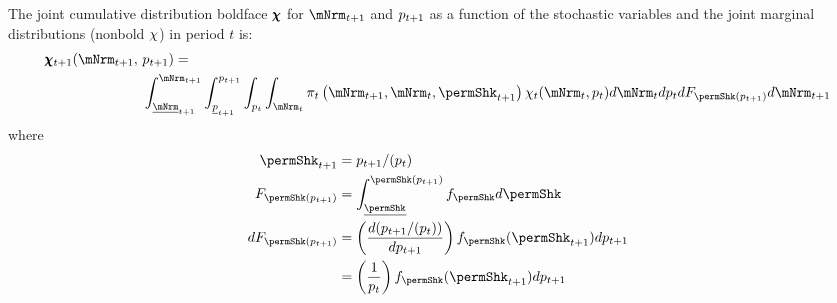 \documentclass[\econtexRoot/BufferStockTheory]{subfiles}
\begin{document}
The joint cumulative distribution boldface $\pmb{\chi}$ for $\mNrmNxt$ and $p_{t+1}$ as a function of the stochastic variables and the joint marginal distributions (nonbold $\chi$) in period $t$ is:
\begin{equation}
  \begin{aligned} \label{eq:MeasTrnstCDF}
  \pmb{\mpPrb}_{t+1}(\mNrmNxt,~& \permLvlPrbNxt) =  \\ &
                                          \int_{\mNrmNxtBot}^{\mNrmNxt}
                                          \int_{\permLvlPrbNxtBot}^{\permLvlPrbNxt}
                                          \int_{\permLvlPrbNow} 
                                          \int_{\mNrmNow} \lomdkPrb_{t}\left(\mNrmNxt,\mNrmNow,\permShkPrbNxt\right)\mpPrb_{t}(\mNrmNow,\permLvlPrbNow)  d \mNrmNow                                                                                     d \permLvlPrbNow
                                                d F_{\permShk(\permLvlPrbNxt)}
                                                d \mNrmNxt \notag
\end{aligned}\end{equation}
where 
\begin{align*}
  \permShkPrbNxt & = \permLvlPrbNxt/(\PermGroFac \permLvlPrbNow) 
\\    F_{\permShk(\permLvlPrbNxt)} & = \int_{\permShkPrbBot}^{\permShk(\permLvlPrbNxt)} f_{\permShk} d\permShk
    \\ dF_{\permShk(\permLvlPrbNxt)} & = \left(\frac{d (\permLvlPrbNxt/(\PermGroFac \permLvlPrbNow))}{d\permLvlPrbNxt}
                             \right)f_{\permShk}(\permShkPrbNxt) d \permLvlPrbNxt 
\\ & = \left(\frac{1}{\PermGroFac \permLvlPrbNow}                             \right)f_{\permShk}(\permShkPrbNxt) d \permLvlPrbNxt 
  \end{align*}
\end{document}
